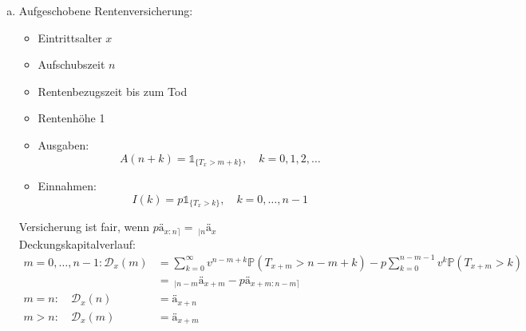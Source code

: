 \begin{enumerate}[(a)]
\begin{center}
	\end{center}
	\newpage
	\item Aufgeschobene Rentenversicherung:\\
	\begin{minipage}[c]{8cm}
		\begin{itemize}
			\item Eintrittsalter $x$
			\item Aufschubszeit $n$
			\item Rentenbezugszeit bis zum Tod
			\item Rentenhöhe 1
		\end{itemize}
	\end{minipage}
	\begin{minipage}[c]{8cm}
		\begin{itemize}
			\item Ausgaben: 
			\[
			A(n+k)=\mathbb{1}_{\{T_x>m+k \}},\quad k=0,1,2,\dots 
			\]
			\item Einnahmen: 
			\[
			I(k)= p\mathbb{1}_{\{T_x>k \}}, \quad k=0,\dots,n-1 
			\]
		\end{itemize}
	\end{minipage}
	Versicherung ist fair, wenn $pä_{x:n\rceil}=~_{|n}ä_x$\\
	Deckungskapitalverlauf:
	\begin{equation*}
	\begin{aligned}
		m=0,\dots,n-1: \mathcal{D}_x(m) &= \sum_{k=0}^{\infty}v^{n-m+k} \mathds{P}(T_{x+m}>n-m+k) -p\sum_{k=0}^{n-m-1}v^k\mathds{P}(T_{x+m}>k)\\
		&=~_{|n-m}ä_{x+m}-pä_{x+m:n-m\rceil}\\
		m=n:\quad \mathcal{D}_x(n) &= ä_{x+n}\\
		m>n:\quad \mathcal{D}_x(m) &= ä_{x+m}
	\end{aligned}
	\end{equation*}
	\begin{center}
		\begin{tikzpicture}[line cap=round,line join=round,>=triangle 45,x=.6cm,y=.6cm]

\end{tikzpicture}
\end{center}
\end{enumerate}
